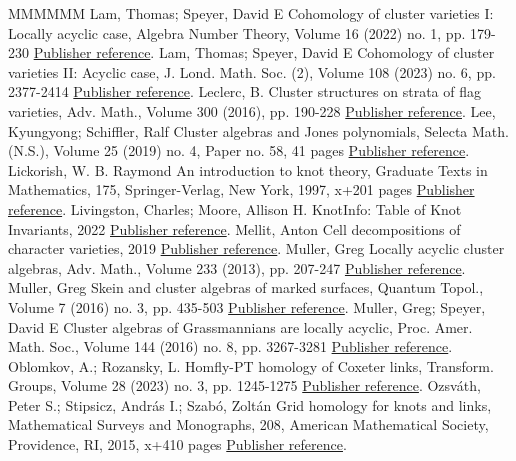 \documentclass[11pt]{article}
\theoremstyle{definition}
\numberwithin{equation}{section}
\begin{document}
\begin{thebibliography}{MMMMMM}
 Lam, Thomas; Speyer, David E Cohomology of cluster varieties I: Locally acyclic case, Algebra Number Theory, Volume 16 (2022) no. 1, pp. 179-230 \href{https://alco.centre-mersenne.org/articles/10.5802/alco.345/#LS}{Publisher reference}.
 Lam, Thomas; Speyer, David E Cohomology of cluster varieties II: Acyclic case, J. Lond. Math. Soc. (2), Volume 108 (2023) no. 6, pp. 2377-2414 \href{https://alco.centre-mersenne.org/articles/10.5802/alco.345/#LS2}{Publisher reference}.
 Leclerc, B. Cluster structures on strata of flag varieties, Adv. Math., Volume 300 (2016), pp. 190-228 \href{https://alco.centre-mersenne.org/articles/10.5802/alco.345/#Lec}{Publisher reference}.
 Lee, Kyungyong; Schiffler, Ralf Cluster algebras and Jones polynomials, Selecta Math. (N.S.), Volume 25 (2019) no. 4, Paper no. 58, 41 pages \href{https://alco.centre-mersenne.org/articles/10.5802/alco.345/#LeeSch}{Publisher reference}.
 Lickorish, W. B. Raymond An introduction to knot theory, Graduate Texts in Mathematics, 175, Springer-Verlag, New York, 1997, x+201 pages \href{https://alco.centre-mersenne.org/articles/10.5802/alco.345/#Lickorish}{Publisher reference}.
 Livingston, Charles; Moore, Allison H. KnotInfo: Table of Knot Invariants, 2022 \href{https://alco.centre-mersenne.org/articles/10.5802/alco.345/#knotinfo}{Publisher reference}.
 Mellit, Anton Cell decompositions of character varieties, 2019 \href{https://alco.centre-mersenne.org/articles/10.5802/alco.345/#Mellit_Cell}{Publisher reference}.
 Muller, Greg Locally acyclic cluster algebras, Adv. Math., Volume 233 (2013), pp. 207-247 \href{https://alco.centre-mersenne.org/articles/10.5802/alco.345/#Muller}{Publisher reference}.
 Muller, Greg Skein and cluster algebras of marked surfaces, Quantum Topol., Volume 7 (2016) no. 3, pp. 435-503 \href{https://alco.centre-mersenne.org/articles/10.5802/alco.345/#Muller_skein}{Publisher reference}.
 Muller, Greg; Speyer, David E Cluster algebras of Grassmannians are locally acyclic, Proc. Amer. Math. Soc., Volume 144 (2016) no. 8, pp. 3267-3281 \href{https://alco.centre-mersenne.org/articles/10.5802/alco.345/#MSLA}{Publisher reference}.
 Oblomkov, A.; Rozansky, L. Homfly-PT homology of Coxeter links, Transform. Groups, Volume 28 (2023) no. 3, pp. 1245-1275 \href{https://alco.centre-mersenne.org/articles/10.5802/alco.345/#ObRo}{Publisher reference}.
 Ozsváth, Peter S.; Stipsicz, András I.; Szabó, Zoltán Grid homology for knots and links, Mathematical Surveys and Monographs, 208, American Mathematical Society, Providence, RI, 2015, x+410 pages \href{https://alco.centre-mersenne.org/articles/10.5802/alco.345/#OSS}{Publisher reference}.

\end{thebibliography}
\end{document}
